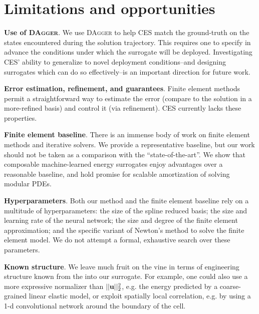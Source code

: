 \section{Limitations and opportunities}\label{sec:discussion}
\textbf{Use of \textsc{DAgger}}. We use \textsc{DAgger} to help CES match the ground-truth on the states encountered during the solution trajectory. This requires one to specify in advance the conditions under which the surrogate will be deployed. Investigating CES' ability to generalize to novel deployment conditions--and designing surrogates which can do so effectively--is an important direction for future work.

\textbf{Error estimation, refinement, and guarantees}. Finite element methods permit a straightforward way to estimate the error (compare to the solution in a more-refined basis) and control it (via refinement). CES currently lacks these properties.

\textbf{Finite element baseline}. There is an immense body of work on finite element methods and iterative solvers. We provide a representative baseline, but our work should not be taken as a comparison with the ``state-of-the-art''. We show that composable machine-learned energy surrogates enjoy advantages over a reasonable baseline, and hold promise for scalable amortization of solving modular PDEs.

\textbf{Hyperparameters}. Both our method and the finite element baseline rely on a multitude of hyperparameters: the size of the spline reduced basis; the size and learning rate of the neural network; the size and degree of the finite element approximation; and the specific variant of Newton's method to solve the finite element model. We do not attempt a formal, exhaustive search over these parameters.

\textbf{Known structure}. We leave much fruit on the vine in terms of engineering structure known from the  into our surrogate. For example, one could also use a more expressive normalizer than $||{\mathbf{u}}||_2^2$, e.g. the energy predicted by a coarse-grained linear elastic model, or exploit spatially local correlation, e.g. by using a 1-d convolutional network around the boundary of the cell.
\vspace{-0.2cm}
